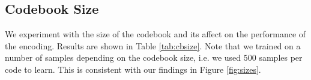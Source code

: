 \documentclass{article}
\begin{document}

\subsection{Codebook Size}
We experiment with the size of the codebook and its affect on the
performance of the encoding. Results are shown in Table \ref{tab:cbsize}.
Note that we trained on a number of samples depending on the codebook
size, i.e. we used $500$ samples per code to learn. This is consistent
with our findings in Figure \ref{fig:sizes}.
\end{document}
